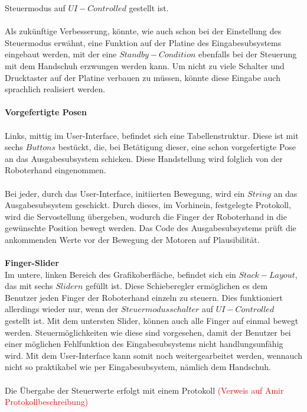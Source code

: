 \documentclass[titlepage,12pt,twoside]{article}
\begin{document}
Steuermodus auf $UI-Controlled$ gestellt ist. \\
\\
Als zukünftige Verbesserung, könnte, wie auch schon bei der Einstellung des Steuermodus erwähnt, eine Funktion auf der Platine des Eingabesubsystems eingebaut werden, mit der eine $Standby-Condition$
ebenfalls bei der Steuerung mit dem Handschuh erzwungen werden kann. Um nicht zu viele Schalter und Drucktaster auf der Platine verbauen zu müssen, könnte diese Eingabe auch sprachlich realisiert werden. \\
\\
\textbf{Vorgefertigte Posen} \\
\\
Links, mittig im User-Interface, befindet sich eine Tabellenstruktur. Diese ist mit sechs $Buttons$ bestückt, die, bei Betätigung dieser, eine schon vorgefertigte Pose an das Ausgabesubsystem schicken. Diese Handstellung
wird folglich von der Roboterhand eingenommen. \\
\\
Bei jeder, durch das User-Interface, initiierten Bewegung, wird ein $String$ an das Ausgabesubsystem geschickt. Durch dieses, im Vorhinein, festgelegte Protokoll, wird die Servostellung übergeben, wodurch die Finger der
Roboterhand in die gewünschte Position bewegt werden. Das Code des Ausgabesubsystems prüft die ankommenden Werte vor der Bewegung der Motoren auf Plausibilität. \\
\\
\textbf{Finger-Slider} \\
Im untere, linken Bereich des Grafikoberfläche, befindet sich ein $Stack-Layout$, das mit sechs $Slidern$ gefüllt ist. Diese Schieberegler ermöglichen es dem Benutzer jeden Finger der Roboterhand einzeln zu steuern. Dies
funktioniert allerdings wieder nur, wenn der $Steuermodusschalter$ auf $UI-Controlled$ gestellt ist. Mit dem untersten Slider, können auch alle Finger auf einmal bewegt werden. Steuermöglichkeiten wie diese sind vorgesehen, 
damit der Benutzer bei einer möglichen Fehlfunktion des Eingabesubsystems nicht handlungsunfähig wird. Mit dem User-Interface kann somit noch weitergearbeitet werden, wennauch nicht so praktikabel wie per Eingabesubsystem, nämlich dem Handschuh. \\
\\
Die Übergabe der Steuerwerte erfolgt mit einem Protokoll \textcolor{red}{(Verweis auf Amir Protokollbeschreibung)} \\
\\
\end{document}
